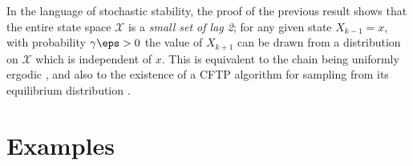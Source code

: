 \documentclass[]{article}
\newcommand{\Epi}{X}
\begin{document}
\begin{rem}\label{rem:ergodicity}
In the language of stochastic stability, the proof of the previous result shows that the entire state space \(\mathcal{X}\) is a \textit{small set of lag 2}; for any given state \(\Epi_{k-1}=x\), with probability \(\gamma\eps>0\) the value of \(\Epi_{k+1}\) can be drawn from a distribution on \(\mathcal{X}\) which is independent of \(x\). This is equivalent to the chain being uniformly ergodic \citep{MeynTweedie-2009}, and also to the existence of a CFTP algorithm for sampling from its equilibrium distribution \citep{FossTweedie-1998}.
\end{rem}


 \section{Examples}\label{sec:examples}
\end{document}
